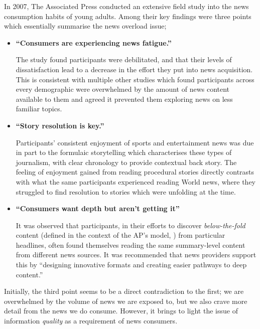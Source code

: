 In 2007, The Associated Press conducted an extensive field study \citeyear{anewmodelfornews} into the news consumption habits of young adults. Among their key findings were three points which essentially summarise the news overload issue;
\begin{itemize}
	\item \textbf{``Consumers are experiencing news fatigue.''} \par
	The study found participants were debilitated, and that their levels of dissatisfaction lead to a decrease in the effort they put into news acquisition. This is consistent with multiple other studies \citep{newsandtheoverloadedcustomer, UnderstandingTheParticipatoryNewsConsumer, InformationAccessinComplexPoorlyStructuredInformationSpaces} which found participants across every demographic were overwhelmed by the amount of news content available to them and agreed it prevented them exploring news on less familiar topics. 
	
	\item \textbf{``Story resolution is key.''} \par
	Participants' consistent enjoyment of sports and entertainment news was due in part to the formulaic storytelling which characterises these types of journalism, with clear chronology to provide contextual back story. The feeling of enjoyment gained from reading procedural stories directly contrasts with what the same participants experienced reading World news, where they struggled to find resolution to stories which were unfolding at the time.
	
	\item \textbf{``Consumers want depth but aren't getting it''} \par
	It was observed that participants, in their efforts to discover \textit{below-the-fold} content (defined in the context of the AP's model, \citeyear[p.37]{anewmodelfornews}) from particular headlines, often found themselves reading the same summary-level content from different news sources. It was recommended that news providers support this by ``designing innovative formats and creating easier pathways to deep content.'' \citep[p.49]{anewmodelfornews}
\end{itemize}

Initially, the third point seems to be a direct contradiction to the first; we are overwhelmed by the volume of news we are exposed to, but we also crave more detail from the news we do consume. However, it brings to light the issue of information \textit{quality} as a requirement of news consumers.

